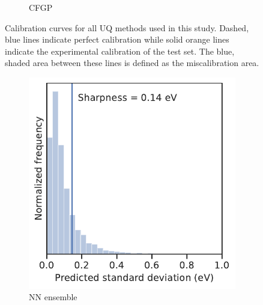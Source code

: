 \documentclass[]{achemso}
\begin{document}
\begin{figure}
\begin{subfigure}{0.32\textwidth}
        \caption{\gls{CFGP}}\label{fig:calibration_cfgp}
    \end{subfigure}
    \caption{Calibration curves for all \gls{UQ} methods used in this study.
    Dashed, blue lines indicate perfect calibration while solid orange lines indicate the experimental calibration of the test set.
    The blue, shaded area between these lines is defined as the miscalibration area.
    }\label{fig:calibration}
\end{figure}

\begin{figure}
    \centering
    \begin{subfigure}{0.32\textwidth}
        \includegraphics[width=\textwidth]{../NN_ensemble/sharpness.pdf}
        \caption{\gls{NN} ensemble}\label{fig:sharpness_ensemble}
    \end{subfigure}
    \begin{subfigure}{0.32\textwidth}

\end{subfigure}
\end{figure}
\end{document}
